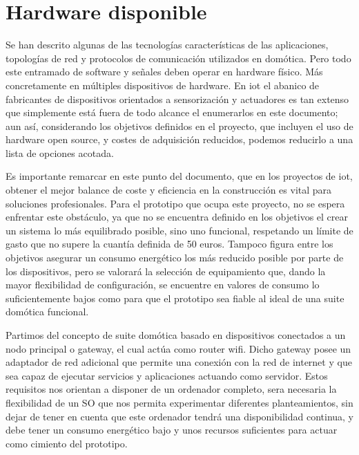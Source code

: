 \section{Hardware disponible}
\label{ch:Capitulo2.4}

Se han descrito algunas de las tecnologías características de las aplicaciones, topologías de red y protocolos de comunicación utilizados en domótica. Pero todo este entramado de software y señales deben operar en hardware físico. Más concretamente en múltiples dispositivos de hardware. En \gls{iot} el abanico de fabricantes de dispositivos orientados a sensorización y actuadores es tan extenso que simplemente está fuera de todo alcance el enumerarlos en este documento; aun así, considerando los objetivos definidos en el proyecto, que incluyen el uso de hardware open source, y costes de adquisición reducidos, podemos reducirlo a una lista de opciones acotada.

\vspace{1.5cm}

Es importante remarcar en este punto del documento, que en los proyectos de \gls{iot}, obtener el mejor balance de coste y eficiencia en la construcción es vital para soluciones profesionales. Para el prototipo que ocupa este proyecto, no se espera enfrentar este obstáculo, ya que no se encuentra definido en los objetivos el crear un sistema lo más equilibrado posible, sino uno funcional, respetando un límite de gasto que no supere la cuantía definida de 50 euros. Tampoco figura entre los objetivos asegurar un consumo energético los más reducido posible por parte de los dispositivos, pero se valorará la selección de equipamiento que, dando la mayor flexibilidad de configuración, se encuentre en valores de consumo lo suficientemente bajos como para que el prototipo sea fiable al ideal de una suite domótica funcional.

\vspace{1.5cm}

Partimos del concepto de suite domótica basado en dispositivos conectados a un nodo principal o gateway, el cual actúa como router wifi. Dicho gateway posee un adaptador de red adicional que permite una conexión con la red de internet y que sea capaz de ejecutar servicios y aplicaciones actuando como servidor. Estos requisitos nos orientan a disponer de un ordenador completo, sera necesaria la flexibilidad de un SO que nos permita experimentar diferentes planteamientos, sin dejar de tener en cuenta que este ordenador tendrá una disponibilidad continua, y debe tener un consumo energético bajo y unos recursos suficientes para actuar como cimiento del prototipo.

